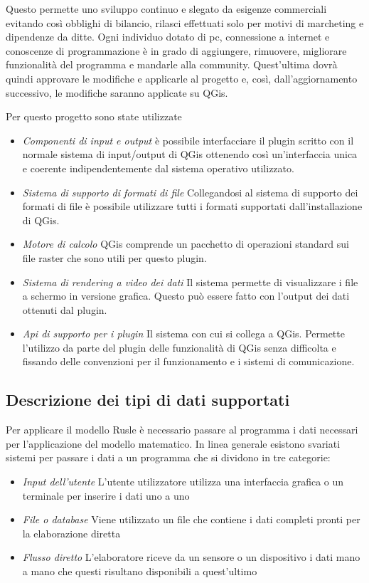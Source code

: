 Questo permette uno sviluppo continuo e slegato da esigenze commerciali evitando così obblighi di bilancio, rilasci effettuati solo per motivi di marcheting e dipendenze da ditte. Ogni individuo dotato di pc, connessione a internet e conoscenze di programmazione è in grado di aggiungere, rimuovere, migliorare funzionalità del programma e mandarle alla community. Quest'ultima dovrà quindi approvare le modifiche e applicarle al progetto e, così, dall'aggiornamento successivo, le modifiche saranno applicate su QGis.

Per questo progetto sono state utilizzate
\begin{itemize}
	\item \textit{Componenti di input e output} è possibile interfacciare il plugin scritto con il normale sistema di input/output di QGis ottenendo così un'interfaccia unica e coerente indipendentemente dal sistema operativo utilizzato.
	\item \textit{Sistema di supporto di formati di file} Collegandosi al sistema di supporto dei formati di file è possibile utilizzare tutti i formati supportati dall'installazione di QGis.
	\item \textit{Motore di calcolo} QGis comprende un pacchetto di operazioni standard sui file raster che sono utili per questo plugin.
	\item \textit{Sistema di rendering a video dei dati} Il sistema permette di visualizzare i file a schermo in versione grafica. Questo può essere fatto con l'output dei dati ottenuti dal plugin.
	\item \textit{Api di supporto per i plugin} Il sistema con cui si collega a QGis. Permette l'utilizzo da parte del plugin delle funzionalità di QGis senza difficolta e fissando delle convenzioni per il funzionamento e i sistemi di comunicazione.
\end{itemize}


\subsection{Descrizione dei tipi di dati supportati}

Per applicare il modello Rusle è necessario passare al programma i dati necessari per l'applicazione del modello matematico.
In linea generale esistono svariati sistemi per passare i dati a un programma che si dividono in tre categorie:

\begin{itemize}
	\item \textit{Input dell'utente} L'utente utilizzatore utilizza una interfaccia grafica o un terminale per inserire i dati uno a uno
	\item \textit{File o database} Viene utilizzato un file che contiene i dati completi pronti per la elaborazione diretta
	\item \textit{Flusso diretto} L'elaboratore riceve da un sensore o un dispositivo i dati mano a mano che questi risultano disponibili a quest'ultimo
\end{itemize}

